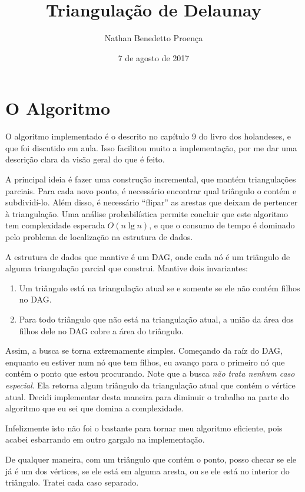 \documentclass[10pt,reqno,a4paper]{article}
\title{Triangulação de Delaunay}
\author{Nathan Benedetto Proença}
\date{7 de agosto de 2017}
\begin{document}
\maketitle
\section{O Algoritmo}

O algoritmo implementado é o descrito no capítulo 9 do livro dos holandeses,
e que foi discutido em aula. Isso facilitou muito a implementação, por me dar
uma descrição clara da visão geral do que é feito.

A principal ideia é fazer uma construção incremental, que mantém triangulações
parciais. Para cada novo ponto, é necessário encontrar qual triângulo o contém
e subdividí-lo. Além disso, é necessário ``flipar'' as arestas que deixam de
pertencer à triangulação. Uma análise probabilística permite concluir que
este algoritmo tem complexidade esperada $O(n\lg n)$, e que o consumo de tempo
é dominado pelo problema de localização na estrutura de dados.

A estrutura de dados que mantive é um DAG, onde cada nó é um triângulo de
alguma triangulação parcial que construi. Mantive dois invariantes:

\begin{enumerate}
    \item Um triângulo está na triangulação atual se e somente se ele
        não contém filhos no DAG.
    \item Para todo triângulo que não está na triangulação atual, a união da
        área dos filhos dele no DAG cobre a área do triângulo.
\end{enumerate}

Assim, a busca se torna extremamente simples. Começando da raíz do DAG,
enquanto eu estiver num nó que tem filhos, eu avanço para o primeiro nó
que contém o ponto que estou procurando. Note que a busca \emph{não trata
nenhum caso especial}. Ela retorna algum triângulo da triangulação atual
que contém o vértice atual. Decidi implementar desta maneira para diminuir
o trabalho na parte do algoritmo que eu sei que domina a complexidade.

Infelizmente isto não foi o bastante para tornar meu algoritmo eficiente,
pois acabei esbarrando em outro gargalo na implementação.

De qualquer maneira, com um triângulo que contém o ponto, posso checar
se ele já é um dos vértices, se ele está em alguma aresta, ou se ele
está no interior do triângulo. Tratei cada caso separado.
\end{document}
